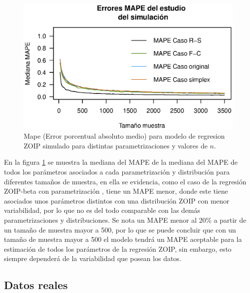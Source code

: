\begin{figure}
	\begin{center}
		\includegraphics[scale=0.6]{MAPE_gnral.eps}	
		\caption{Mape (Error porcentual absoluto medio) para modelo de regresion ZOIP si\-mu\-la\-do para distintas parametrizaciones y valores de $n$.}
		\label{Mape_gnrl}
	\end{center}
\end{figure}

En la figura \ref{Mape_gnrl} se muestra la mediana del MAPE de la mediana del MAPE de todos los par\'{a}metros asociados a cada parametrizaci\'{o}n y distribuci\'{o}n para diferentes tama\~{n}os de muestra, en ella se evidencia, como el caso de la regresi\'{o}n ZOIP-beta con parametrizaci\'{o}n \cite{Stasinopoulos2}, tiene un MAPE menor, donde este tiene asociados unos par\'{a}metros distintos con una distribuci\'{o}n ZOIP con menor variabilidad, por lo que no es del todo comparable con las dem\'{a}s parametrizaciones y distribuciones. Se nota un MAPE menor al $20\%$ a partir de un tama\~{n}o de muestra mayor a 500, por lo que se puede concluir que con un tama\~{n}o de muestra mayor a 500 el modelo tendr\'{a} un MAPE aceptable para la estimaci\'{o}n de todos los par\'{a}metros de la regresi\'{o}n ZOIP, sin embargo, esto siempre depender\'{a} de la variabilidad que posean los datos.

\subsection{Datos reales}

